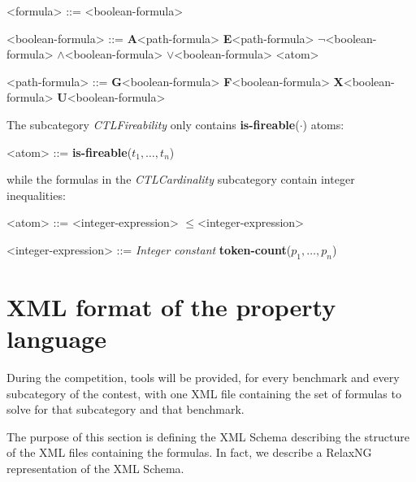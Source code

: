 \documentclass[10pt,english,a4paper]{article}
\newcommand\ctla             {\textbf{A}\xspace}
\newcommand\ctle             {\textbf{E}\xspace}
\newcommand\ltlf             {\textbf{F}\xspace}
\newcommand\ltlg             {\textbf{G}\xspace}
\newcommand\ltlx             {\textbf{X}\xspace}
\newcommand\ltlu             {\textbf{U}\xspace}
\newcommand\logicnot         {\boldmath$\lnot$\xspace}
\newcommand\logicand         {\boldmath$\land$\xspace}
\newcommand\logicor          {\boldmath$\lor$\xspace}
\newcommand\atomleq          {\boldmath$\leq$\xspace}
\newcommand\atomisfire[1]    {\textbf{is-fireable}(#1)}
\newcommand\atomtokenscnt[1] {\textbf{token-count}(#1)}
\begin{document}
\begin{grammar}
<formula> ::= <boolean-formula>

<boolean-formula> ::=
     \ctla <path-formula>
\alt \ctle <path-formula>
\alt \logicnot <boolean-formula>
 \logicand <boolean-formula>
 \logicor <boolean-formula>
\alt <atom>

<path-formula> ::=
     \ltlg <boolean-formula>
\alt \ltlf <boolean-formula>
\alt \ltlx <boolean-formula>
 \ltlu <boolean-formula>
\end{grammar}

The subcategory \emph{CTLFireability} only contains \atomisfire{$\cdot$}
atoms:

\begin{grammar}
<atom> ::= \atomisfire{$t_1, \ldots, t_n$}
\end{grammar}

while the formulas in the \emph{CTLCardinality} subcategory contain
integer inequalities:

\begin{grammar}
<atom> ::= <integer-expression> \atomleq <integer-expression>

<integer-expression> ::= \textit{Integer constant}
\alt \atomtokenscnt{$p_1, \ldots, p_n$}
\end{grammar}



\section{XML format of the property language}
\label{s:rng}

During the competition, tools will be provided, for every benchmark and
every subcategory of the contest, with one XML file containing the set of
formulas to solve for that subcategory and that benchmark.

The purpose of this section is defining the XML Schema describing the
structure of the XML files containing the formulas.
In fact, we describe a RelaxNG representation of the XML Schema.
\end{document}
